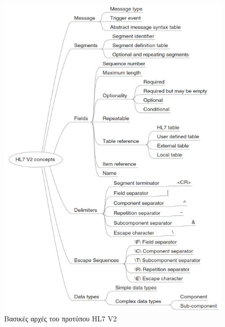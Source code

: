 	\begin{figure}[H]
	    \centering
	    \includegraphics[width=1\textwidth]{HL7_V2_concepts.jpg}
	    \caption{Βασικές αρχές του προτύπου HL7 V2}
	    \label{fig:HL7_V2_concepts}
	\end{figure}
\newpage
